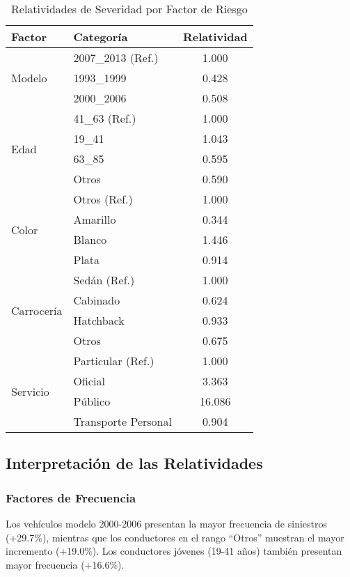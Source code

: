 \begin{table}[H]
\centering
\caption{Relatividades de Severidad por Factor de Riesgo}
\begin{tabular}{|l|l|c|}
\hline
\textbf{Factor} & \textbf{Categoría} & \textbf{Relatividad} \\
\hline
\multirow{3}{*}{Modelo} & 2007\_2013 (Ref.) & 1.000 \\
                        & 1993\_1999 & 0.428 \\
                        & 2000\_2006 & 0.508 \\
\hline
\multirow{4}{*}{Edad} & 41\_63 (Ref.) & 1.000 \\
                      & 19\_41 & 1.043 \\
                      & 63\_85 & 0.595 \\
                      & Otros & 0.590 \\
\hline
\multirow{4}{*}{Color} & Otros (Ref.) & 1.000 \\
                       & Amarillo & 0.344 \\
                       & Blanco & 1.446 \\
                       & Plata & 0.914 \\
\hline
\multirow{4}{*}{Carrocería} & Sedán (Ref.) & 1.000 \\
                            & Cabinado & 0.624 \\
                            & Hatchback & 0.933 \\
                            & Otros & 0.675 \\
\hline
\multirow{4}{*}{Servicio} & Particular (Ref.) & 1.000 \\
                          & Oficial & 3.363 \\
                          & Público & 16.086 \\
                          & Transporte Personal & 0.904 \\
\hline
\end{tabular}
\end{table}

\subsection{Interpretación de las Relatividades}

\subsubsection{Factores de Frecuencia}
Los vehículos modelo 2000-2006 presentan la mayor frecuencia de siniestros (+29.7\%), mientras que los conductores en el rango ``Otros'' muestran el mayor incremento (+19.0\%). Los conductores jóvenes (19-41 años) también presentan mayor frecuencia (+16.6\%).

